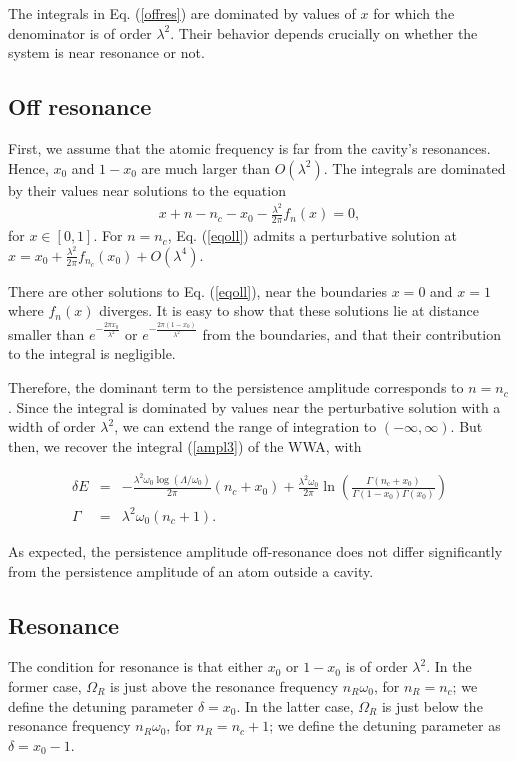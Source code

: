 \documentclass[12pt]{article}
\numberwithin{equation}{section}
\begin{document}
 The integrals in Eq. (\ref{offres}) are dominated by  values of $x$ for which the denominator is of order $\lambda^2$.
 Their behavior  depends crucially on whether the system is near resonance or not.






\subsection{ Off resonance}

First, we assume that the atomic frequency is far from the cavity's resonances. Hence, $x_0$ and $1 - x_0$ are much larger than $O(\lambda^2)$. The integrals are dominated by their values near solutions to the equation
\begin{eqnarray}
x + n - n_c - x_0 - \frac{\lambda^2 }{2\pi} f_n(x) = 0, \label{eqoll}
\end{eqnarray}
for $x\in [0, 1]$. For $n = n_c$, Eq. (\ref{eqoll}) admits a perturbative solution at $x = x_0 + \frac{\lambda^2 }{2\pi} f_{n_c}(x_0) + O(\lambda^4)$.

There are   other solutions to Eq. (\ref{eqoll}), near the boundaries  $x = 0$ and $x = 1$ where $f_n(x)$ diverges.
 It is easy to show that these solutions lie at distance  smaller than $e^{-\frac{2 \pi x_0}{\lambda^2}}$ or $e^{-\frac{2 \pi (1-x_0)}{\lambda^2}}$ from the boundaries,  and that their contribution to the integral is negligible.

Therefore, the dominant term to the persistence amplitude corresponds to $n = n_c$. Since the integral is dominated by values near the perturbative solution with a width of order $\lambda^2$, we can extend the range of integration to $(-\infty, \infty)$. But then, we recover the integral (\ref{ampl3}) of the WWA, with

\begin{eqnarray}
\delta E &=&  - \frac{\lambda^2 \omega_0\log (\Lambda/\omega_0) }{2\pi} (n_c  + x_0)  +  \frac{\lambda^2\omega_0 }{2\pi} \ln \left( \frac{\Gamma(n_c + x_0) }{\Gamma(1- x_0 )  \Gamma(x_0)  }\right) \\
\Gamma &=&  \lambda^2 \omega_0 (n_c + 1).
\end{eqnarray}

As expected, the persistence amplitude off-resonance does not differ significantly from the persistence amplitude of an atom outside a cavity.


\subsection{Resonance}
The condition for resonance is that either $x_0$ or $1 - x_0$ is of order $\lambda^2$. In the former case,
$\Omega_R$ is just above the resonance frequency $n_R \omega_0$, for $n_R = n_c$; we define the detuning parameter $\delta = x_0$.
In the latter  case, $\Omega_R$ is just below the resonance frequency $n_R \omega_0$, for $n_R = n_c + 1$; we define the detuning parameter as $\delta =   x_0 - 1$.
\end{document}
